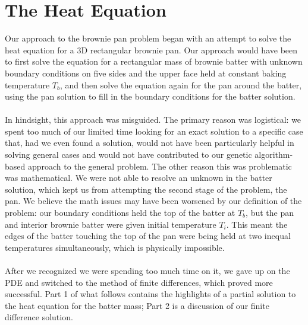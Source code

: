 \documentclass[12pt]{reedmcm}
\begin{document}
\section{The Heat Equation}
Our approach to the brownie pan problem began with an attempt to solve the heat equation for a 3D rectangular brownie pan.  Our approach would have been to first solve the equation for a rectangular mass of brownie batter with unknown boundary conditions on five sides and the upper face held at constant baking temperature $T_b$, and then solve the equation again for the pan around the batter, using the pan solution to fill in the boundary conditions for the batter solution.\\
\\
In hindsight, this approach was misguided.  The primary reason was logistical: we spent too much of our limited time looking for an exact solution to a specific case that, had we even found a solution, would not have been particularly helpful in solving general cases and would not have contributed to our genetic algorithm-based approach to the general problem.  The other reason this was problematic was mathematical.  We were not able to resolve an unknown in the batter solution, which kept us from attempting the second stage of the problem, the pan.  We believe the math issues may have been worsened by our definition of the problem: our boundary conditions held the top of the batter at $T_b$, but the pan and interior brownie batter were given initial temperature $T_i$.  This meant the edges of the batter touching the top of the pan were being held at two inequal temperatures simultaneously, which is physically impossible.\\
\\
After we recognized we were spending too much time on it, we gave up on the PDE and switched to the method of finite differences, which proved more successful.  Part 1 of what follows contains the highlights of a partial solution to the heat equation for the batter mass; Part 2 is a discussion of our finite difference solution.\\
\end{document}
